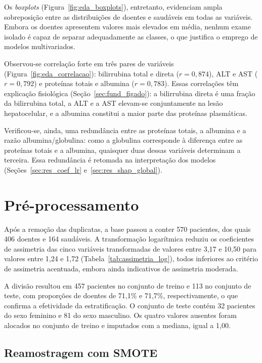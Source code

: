 Os \textit{boxplots} (Figura~\ref{fig:eda_boxplots}), entretanto, evidenciam ampla sobreposição entre as distribuições de doentes e saudáveis em todas as variáveis. Embora os doentes apresentem valores mais elevados em média, nenhum exame isolado é capaz de separar adequadamente as classes, o que justifica o emprego de modelos multivariados.

Observou-se correlação forte em três pares de variáveis (Figura~\ref{fig:eda_correlacao}): bilirrubina total e direta ($r = 0{,}874$), ALT e AST ($r = 0{,}792$) e proteínas totais e albumina ($r = 0{,}783$). Essas correlações têm explicação fisiológica (Seção~\ref{sec:fund_figado}): a bilirrubina direta é uma fração da bilirrubina total, a ALT e a AST elevam-se conjuntamente na lesão hepatocelular, e a albumina constitui a maior parte das proteínas plasmáticas.

Verificou-se, ainda, uma redundância entre as proteínas totais, a albumina e a razão albumina/globulina: como a globulina corresponde à diferença entre as proteínas totais e a albumina, quaisquer duas dessas variáveis determinam a terceira. Essa redundância é retomada na interpretação dos modelos (Seções~\ref{sec:res_coef_lr} e~\ref{sec:res_shap_global}).

\section{Pré-processamento}
\label{sec:res_preproc}

Após a remoção das duplicatas, a base passou a conter 570 pacientes, dos quais 406 doentes e 164 saudáveis. A transformação logarítmica reduziu os coeficientes de assimetria das cinco variáveis transformadas de valores entre 3,17 e 10,50 para valores entre 1,24 e 1,72 (Tabela~\ref{tab:assimetria_log}), todos inferiores ao critério de assimetria acentuada, embora ainda indicativos de assimetria moderada.

A divisão resultou em 457 pacientes no conjunto de treino e 113 no conjunto de teste, com proporções de doentes de 71,1\% e 71,7\%, respectivamente, o que confirma a efetividade da estratificação. O conjunto de teste contém 32 pacientes do sexo feminino e 81 do sexo masculino. Os quatro valores ausentes foram alocados no conjunto de treino e imputados com a mediana, igual a 1,00.

\subsection{Reamostragem com SMOTE}
\label{sec:res_smote}

